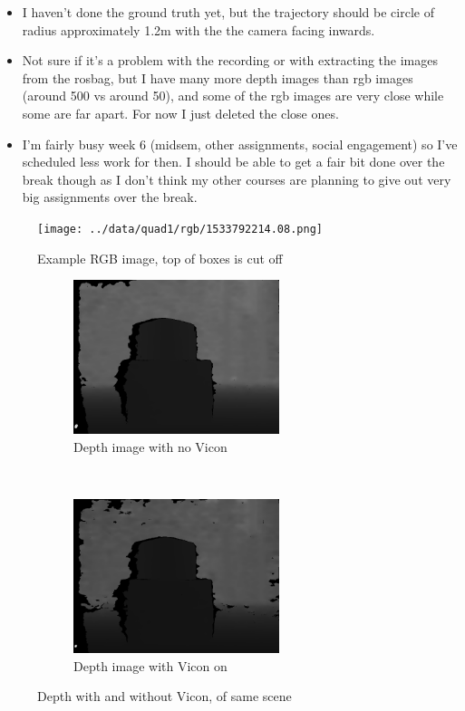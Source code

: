 \documentclass[12pt,a4paper]{article}
\begin{document}
\begin{itemize}
\item I haven't done the ground truth yet, but the trajectory should be circle of radius approximately 1.2m with the the camera facing inwards.
\item Not sure if it's a problem with the recording or with extracting the images from the rosbag, but I have many more depth images than rgb images (around 500 vs around 50), and some of the rgb images are very close while some are far apart. For now I just deleted the close ones.
\item I'm fairly busy week 6 (midsem, other assignments, social engagement) so I've scheduled less work for then. I should be able to get a fair bit done over the break though as I don't think my other courses are planning to give out very big assignments over the break.
\end{itemize}

\begin{figure}[h]
  \centering
  \texttt{[image: ../data/quad1/rgb/1533792214.08.png]}
  \caption{Example RGB image, top of boxes is cut off}
  \label{f: quad low rgb}
\end{figure}

\begin{figure}[h]
  \centering
  \begin{subfigure}[t]{0.5\textwidth}
  \centering
  \includegraphics[width=60mm]{21-no-vicon/depth/0.001719236.png}
  \caption{Depth image with no Vicon}
  \end{subfigure}%
  ~
  \begin{subfigure}[t]{0.5\textwidth}
  \centering
  \includegraphics[width=60mm]{25-vicon/depth/0.001719236.png}
  \caption{Depth image with Vicon on}
  \end{subfigure}%
  \caption{Depth with and without Vicon, of same scene}
  \label{f: Kabsch quad bad}
\end{figure}
\end{document}
